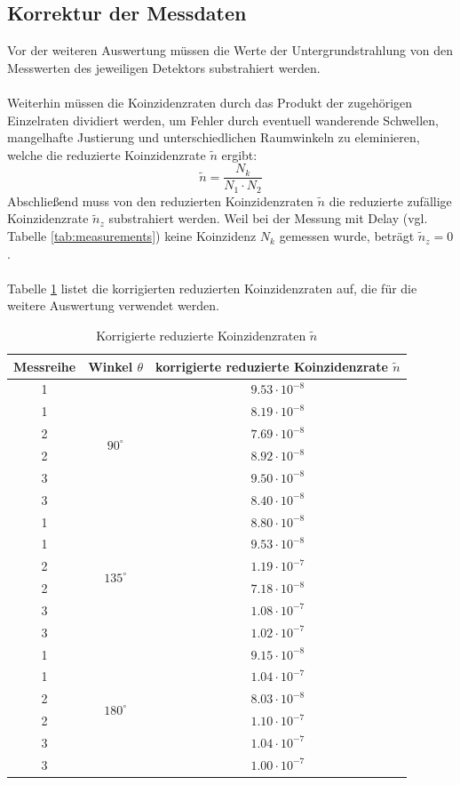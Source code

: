 \documentclass[a4paper,titlepage]{scrartcl}
\numberwithin{equation}{section}
\begin{document}
\subsection{Korrektur der Messdaten}
Vor der weiteren Auswertung müssen die Werte der Untergrundstrahlung von den Messwerten des jeweiligen Detektors substrahiert werden.\\ \\
Weiterhin müssen die Koinzidenzraten durch das Produkt der zugehörigen Einzelraten dividiert werden, um Fehler durch eventuell wanderende Schwellen, mangelhafte Justierung und unterschiedlichen Raumwinkeln zu eleminieren, welche die reduzierte Koinzidenzrate $\tilde{n}$ ergibt:
\begin{equation*}
\tilde{n}=\frac{N_k}{N_1 \cdot N_2}
\end{equation*}
Abschließend muss von den reduzierten Koinzidenzraten $\tilde{n}$ die reduzierte zufällige Koinzidenzrate $\tilde{n}_z$ substrahiert werden. Weil bei der Messung mit Delay (vgl. Tabelle \ref{tab:measurements}) keine Koinzidenz $N_k$ gemessen wurde, beträgt $\tilde{n}_z=0$.\\ \\
Tabelle \ref{tab:correctedCoincidences} listet die korrigierten reduzierten Koinzidenzraten auf, die für die weitere Auswertung verwendet werden.
\begin{table}[H]
\centering
\begin{tabular}{c|c|c}
Messreihe & Winkel $\theta$ & korrigierte reduzierte Koinzidenzrate $\tilde{n}$\\
\hline
1 & \multirow{6}{*}{$90^{\circ}$} & $9.53 \cdot 10^{-8}$\\
1 & & $8.19 \cdot 10^{-8}$\\
2 & & $7.69 \cdot 10^{-8}$\\
2 & & $8.92 \cdot 10^{-8}$\\
3 & & $9.50 \cdot 10^{-8}$\\
3 & & $8.40 \cdot 10^{-8}$\\
\hline
1 & \multirow{6}{*}{$135^{\circ}$} & $8.80 \cdot 10^{-8}$\\
1 & & $9.53 \cdot 10^{-8}$\\
2 & & $1.19 \cdot 10^{-7}$\\
2 & & $7.18 \cdot 10^{-8}$\\
3 & & $1.08 \cdot 10^{-7}$\\
3 & & $1.02 \cdot 10^{-7}$\\
\hline
1 & \multirow{6}{*}{$180^{\circ}$} & $9.15 \cdot 10^{-8}$\\
1 & & $1.04 \cdot 10^{-7}$\\
2 & & $8.03 \cdot 10^{-8}$\\
2 & & $1.10 \cdot 10^{-7}$\\
3 & & $1.04 \cdot 10^{-7}$\\
3 & & $1.00 \cdot 10^{-7}$\\
\end{tabular}
\caption{Korrigierte reduzierte Koinzidenzraten $\tilde{n}$}
\label{tab:correctedCoincidences}
\end{table}
\end{document}
